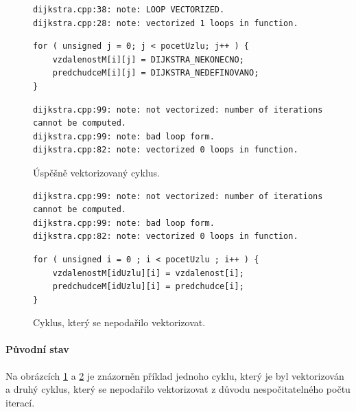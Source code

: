\begin{figure}
    \centering
	\caption{Úspěšně vektorizovaný cyklus.}
	\label{f:dij:vect1}
    \begin{lstlisting}
dijkstra.cpp:38: note: LOOP VECTORIZED.
dijkstra.cpp:28: note: vectorized 1 loops in function.
    \end{lstlisting}
	\begin{lstlisting}
for ( unsigned j = 0; j < pocetUzlu; j++ ) {
	vzdalenostM[i][j] = DIJKSTRA_NEKONECNO;
	predchudceM[i][j] = DIJKSTRA_NEDEFINOVANO;
}
    \end{lstlisting}
    
    \begin{lstlisting}
dijkstra.cpp:99: note: not vectorized: number of iterations cannot be computed.
dijkstra.cpp:99: note: bad loop form.
dijkstra.cpp:82: note: vectorized 0 loops in function.
    \end{lstlisting}
\end{figure}
\begin{figure}
    \centering
    \caption{Cyklus, který se nepodařilo vektorizovat.}
	\label{f:dij:vect2}
    \begin{lstlisting}
dijkstra.cpp:99: note: not vectorized: number of iterations cannot be computed.
dijkstra.cpp:99: note: bad loop form.
dijkstra.cpp:82: note: vectorized 0 loops in function.
    \end{lstlisting}
    
	\begin{lstlisting}
for ( unsigned i = 0 ; i < pocetUzlu ; i++ ) {
	vzdalenostM[idUzlu][i] = vzdalenost[i];
	predchudceM[idUzlu][i] = predchudce[i];
}
	\end{lstlisting}
\end{figure}

\paragraph{Původní stav}
Na obrázcích \ref{f:dij:vect1} a \ref{f:dij:vect2} je znázorněn příklad jednoho cyklu, který je byl vektorizován a druhý cyklus, který se nepodařilo vektorizovat z důvodu nespočitatelného počtu iterací.

